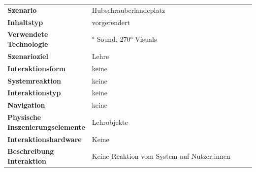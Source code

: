 \begin{longtable} {>{\raggedright\arraybackslash}p{0.3\linewidth}
    >{\raggedright\arraybackslash}p{0.7\linewidth}}
    \textbf{Szenario} & Hubschrauberlandeplatz \\
    \textbf{Inhaltstyp} & vorgerendert \\
    \textbf{Verwendete Technologie} & 360° Sound, 270° Visuals \\
    \textbf{Szenarioziel} & Lehre \\
    \textbf{Interaktionsform} & keine \\
    \textbf{Systemreaktion} & keine \\
    \textbf{Interaktionstyp} & keine \\
    \textbf{Navigation} & keine \\
    \textbf{Physische Inszenierungselemente} & Lehrobjekte \\
    \textbf{Interaktionshardware} & Keine \\
    \textbf{Beschreibung Interaktion} & Keine Reaktion vom System auf Nutzer:innen \\[0.8em]
    \midrule

\end{longtable}